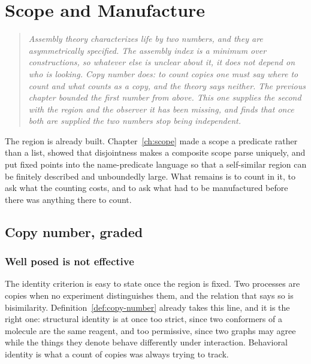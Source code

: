 \chapter{Scope and Manufacture}
\label{sec:scope-manufacture}

\begin{quote}\itshape\small
Assembly theory characterizes life by two numbers, and they are
asymmetrically specified. The assembly index is a minimum over
constructions, so whatever else is unclear about it, it does not depend on
who is looking. Copy number does: to count copies one must say where to
count and what counts as a copy, and the theory says neither. The previous
chapter bounded the first number from above. This one supplies the second
with the region and the observer it has been missing, and finds that once
both are supplied the two numbers stop being independent.
\end{quote}

The region is already built. Chapter~\ref{ch:scope} made a scope a
predicate rather than a list, showed that disjointness makes a composite
scope parse uniquely, and put fixed points into the name-predicate
language so that a self-similar region can be finitely described and
unboundedly large. What remains is to count in it, to ask what the
counting costs, and to ask what had to be manufactured before there was
anything there to count.

\section{Copy number, graded}
\label{scm:sec:graded}

\subsection{Well posed is not effective}

The identity criterion is easy to state once the region is fixed. Two
processes are copies when no experiment distinguishes them, and the
relation that says so is bisimilarity. Definition~\ref{def:copy-number}
already takes this line, and it is the right one: structural identity is
at once too strict, since two conformers of a molecule are the same
reagent, and too permissive, since two graphs may agree while the things
they denote behave differently under interaction. Behavioral identity is
what a count of copies was always trying to track.

